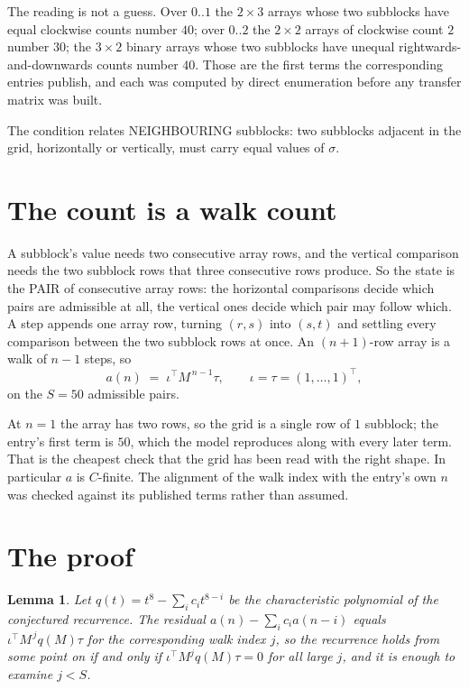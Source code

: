 \documentclass[11pt,a4paper]{article}
\theoremstyle{plain}
\newtheorem{lemma}[theorem]{Lemma}
\theoremstyle{definition}
\begin{document}
The reading is not a guess. Over $0..1$ the $2\times3$ arrays whose two subblocks have equal
clockwise counts number $40$; over $0..2$ the $2\times2$ arrays of clockwise count $2$ number
$30$; the $3\times2$ binary arrays whose two subblocks have unequal rightwards-and-downwards
counts number $40$. Those are the first terms the corresponding entries publish, and each was
computed by direct enumeration before any transfer matrix was built.

The condition relates NEIGHBOURING subblocks: two subblocks adjacent in the grid, horizontally
or vertically, must carry equal values of $\sigma$.

\section{The count is a walk count}

A subblock's value needs two consecutive array rows, and the vertical
comparison needs the two subblock rows that three consecutive rows produce. So the state is the
PAIR of consecutive array rows: the horizontal comparisons decide which pairs are admissible at
all, the vertical ones decide which pair may follow which. A step appends one array row,
turning $(r,s)$ into $(s,t)$ and settling every comparison between the two subblock rows at
once. An $(n+1)$-row array is a walk of $n-1$ steps, so
\[
a(n)\;=\;\iota^{\!\top}M^{\,n-1}\tau,\qquad\iota=\tau=(1,\dots,1)^{\!\top},
\]
on the $S=50$ admissible pairs.

At $n=1$ the array has two rows, so the grid is a single row of $1$
subblock; the entry's first term is $50$, which the model
reproduces along with every later term. That is the cheapest check that the grid has been read
with the right shape.
In particular $a$ is $C$-finite. The alignment of the walk index with the entry's own $n$ was
checked against its published terms rather than assumed.

\section{The proof}

\begin{lemma}\label{lem:crit}
Let $q(t)=t^{8}-\sum_i c_it^{8-i}$ be the characteristic polynomial of the
conjectured recurrence. The residual $a(n)-\sum_ic_ia(n-i)$ equals
$\iota^{\!\top}M^{\,j}q(M)\tau$ for the corresponding walk index $j$, so the recurrence
holds from some point on if and only if $\iota^{\!\top}M^{j}q(M)\tau=0$ for all large $j$,
and it is enough to examine $j<S$.
\end{lemma}
\end{document}
